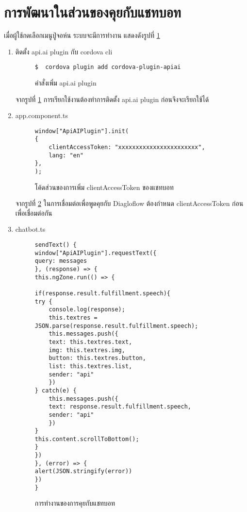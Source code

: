 \section{การพัฒนาในส่วนของคุยกับแชทบอท}
เมื่อผู้ใช้กดเลือกเมนูปู่จอห์น ระบบจะมีการทำงาน แสดงดังรูปที่ \ref{Fig:4-addchatbot}
\begin{enumerate}
	\item ติดตั้ง api.ai plugin กับ cordova cli
	\begin{figure}[H]
		{\begin{lstlisting}
$  cordova plugin add cordova-plugin-apiai
		\end{lstlisting}}
		\caption{คำสั่งเพิ่ม api.ai plugin}
		\label{Fig:4-addchatbot}
	\end{figure}
	จากรูปที่ \ref{Fig:4-addchatbot} การเรียกใช้งานต้องทำการติดตั้ง api.ai plugin ก่อนจึงจะเรียกใช้ได้
	\newline

	\item app.component.ts
	\begin{figure}[H]
		{\begin{lstlisting}
window["ApiAIPlugin"].init(
{
	clientAccessToken: "xxxxxxxxxxxxxxxxxxxxxxx",
	lang: "en"
}, 
);
		\end{lstlisting}}
		\caption{โค้ดส่วนของการเพิ่ม clientAccessToken ของแชทบอท}
		\label{Fig:4-configchatbot}
	\end{figure}
	จากรูปที่ \ref{Fig:4-configchatbot} ในการเชื่อมต่อเพื่อพูดคุยกับ Diagloflow ต้องกำหนด clientAccessToken ก่อนเพื่อเชื่อมต่อกัน
	\newpage

	\item chatbot.ts
	\begin{figure}[H]
		{\begin{lstlisting}
sendText() {
window["ApiAIPlugin"].requestText({
query: messages
}, (response) => {
this.ngZone.run(() => {

if(response.result.fulfillment.speech){
try {
	console.log(response);
	this.textres = JSON.parse(response.result.fulfillment.speech);
	this.messages.push({
	text: this.textres.text,
	img: this.textres.img,
	button: this.textres.button,
	list: this.textres.list,
	sender: "api"
	})
} catch(e) {
	this.messages.push({
	text: response.result.fulfillment.speech,
	sender: "api"
	})
}
this.content.scrollToBottom();
}  
})
}, (error) => {
alert(JSON.stringify(error))
})
}
		\end{lstlisting}}
		\caption{การทำงานของการคุยกับแชทบอท}
		\label{Fig:4-chatbot}
	\end{figure}
	\newpage


\end{enumerate}
